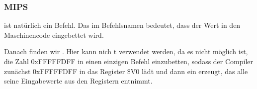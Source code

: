 \subsubsection{MIPS}




 ist natürlich ein  Befehl. Das  im Befehlsnamen bedeutet,
dass der Wert in den Maschinencode eingebettet wird.

Danach finden wir \AND. Hier kann nich t verwendet werden, da es nicht
möglich ist, die Zahl 0xFFFFFDFF in einen einzigen Befehl einzubetten, sodass
der Compiler zunächst 0xFFFFFDFF in das Register \$V0 lädt und dann ein \AND
erzeugt, das alle seine Eingabewerte aus den Registern entnimmt.